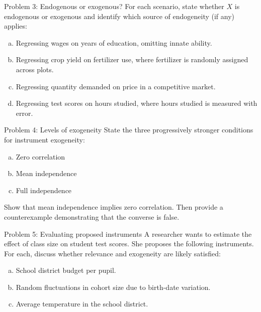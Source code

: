 \documentclass[10pt]{beamer}
\begin{document}
\begin{frame}{Problem 3: Endogenous or exogenous?}
\label{q3}
For each scenario, state whether $X$ is endogenous or exogenous and identify which source of endogeneity (if any) applies:

\begin{enumerate}[(a)]
  \item Regressing wages on years of education, omitting innate ability.
  \item Regressing crop yield on fertilizer use, where fertilizer is randomly assigned across plots.
  \item Regressing quantity demanded on price in a competitive market.
  \item Regressing test scores on hours studied, where hours studied is measured with error.
\end{enumerate}

\vfill
\hfill\hyperlink{s3}{}
\end{frame}

\begin{frame}{Problem 4: Levels of exogeneity}
\label{q4}
State the three progressively stronger conditions for instrument exogeneity:
\begin{enumerate}[(a)]
  \item Zero correlation
  \item Mean independence
  \item Full independence
\end{enumerate}

\vspace{0.5em}
Show that mean independence implies zero correlation. Then provide a counterexample demonstrating that the converse is false.

\vfill
\hfill\hyperlink{s4}{}
\end{frame}

\begin{frame}{Problem 5: Evaluating proposed instruments}
\label{q5}
A researcher wants to estimate the effect of class size on student test scores. She proposes the following instruments. For each, discuss whether relevance and exogeneity are likely satisfied:

\begin{enumerate}[(a)]
  \item School district budget per pupil.
  \item Random fluctuations in cohort size due to birth-date variation.
  \item Average temperature in the school district.
\end{enumerate}

\vfill
\hfill\hyperlink{s5}{}
\end{frame}
\end{document}
